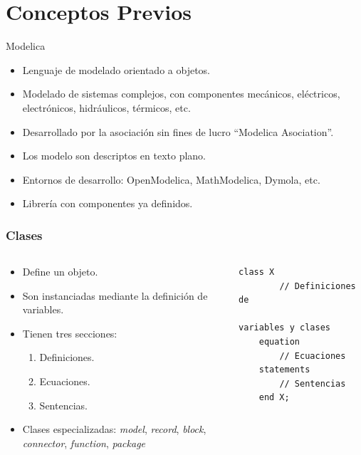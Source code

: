 \section{Conceptos Previos}

\begin{frame}{Modelica} 
    \begin{itemize}
        \item Lenguaje de modelado orientado a objetos.
        \item Modelado de sistemas complejos, con componentes mecánicos, eléctricos, electrónicos, hidráulicos, térmicos, etc.     
        \item Desarrollado por la asociación sin fines de lucro ``Modelica Asociation''.        
        \item Los modelo son descriptos en texto plano.        
        \item Entornos de desarrollo: OpenModelica, MathModelica, Dymola, etc.
        \item Librería con componentes ya definidos.
    \end{itemize}
\end{frame}
 

\begin{frame}[fragile]
\frametitle{Clases} 
\begin{columns}  
\begin{block}{}
\begin{itemize}
    \item Define un objeto.
    \item Son instanciadas mediante la definición de variables.
    \item Tienen tres secciones:
        \begin{enumerate}
            \item Definiciones.
            \item Ecuaciones.
            \item Sentencias.
        \end{enumerate}
    \item Clases especializadas:  \textit{model}, \textit{record}, \textit{block}, \textit{connector}, \textit{function}, \textit{package}   
\end{itemize}
\end{block}{}
\begin{lstlisting}[style=base]
    class X
        // Definiciones de 
                variables y clases   
    equation
        // Ecuaciones
    statements
        // Sentencias
    end X;   
\end{lstlisting}
\end{columns}
\end{frame}

